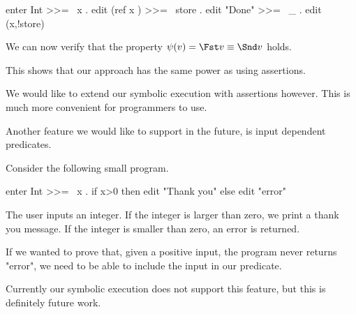 \begin{TASK}
  enter Int >>= \ x . edit (ref x ) >>= \ store . edit "Done" >>= \ _ . edit (x,!store)
\end{TASK}

We can now verify that the property $\psi(v) = \Fst v \equiv \Snd v$ holds.

This shows that our approach has the same power as using assertions.

We would like to extend our symbolic execution with assertions however.
This is much more convenient for programmers to use.

Another feature we would like to support in the future, is input dependent predicates.

\begin{example}
  Consider the following small program.

  \begin{TASK}
    enter Int >>= \ x . if x>0 then edit "Thank you" else edit "error"
  \end{TASK}

  The user inputs an integer.
  If the integer is larger than zero, we print a thank you message.
  If the integer is smaller than zero, an error is returned.

  If we wanted to prove that, given a positive input, the program never returns "error", we need to be able to include the input in our predicate.
\end{example}

Currently our symbolic execution does not support this feature, but this is definitely future work.
